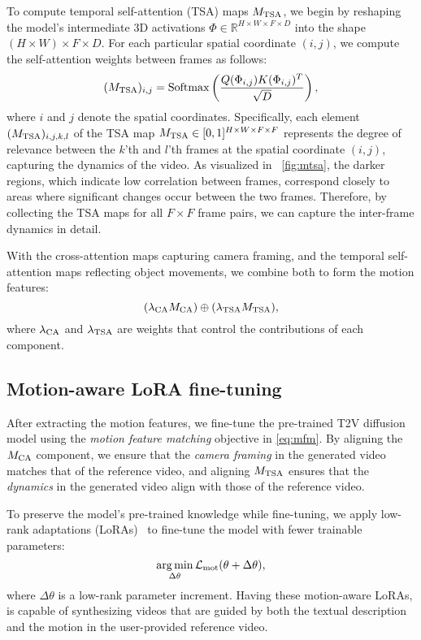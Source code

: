 To compute temporal self-attention (TSA) maps $M_{{\rm TSA}}$, we begin by reshaping the model's intermediate 3D activations $\Phi\in\mathbb{R}^{H\times W\times F\times D}$ into the shape $(H\times W)\times F\times D$. For each particular spatial coordinate $(i,j)$, we compute the self-attention weights between frames as follows:
\begin{equation}
(M_{{\rm TSA}})_{i,j}=\mathrm{Softmax}\left(\frac{Q(\Phi_{i,j})K(\Phi_{i,j})^T}{\sqrt{D}}\right)
\label{eq:features},
\end{equation}
where $i$ and $j$ denote the spatial coordinates. Specifically, each element $(M_{{\rm TSA}})_{i,j,k,l}$ of the TSA map $M_{{\rm TSA}}\in [0,1]^{H\times W\times F\times F}$ represents the degree of relevance between the $k$'th and $l$'th frames at the spatial coordinate $(i,j)$, capturing the dynamics of the video. As visualized in ~\cref{fig:mtsa}, the darker regions, which indicate low correlation between frames, correspond closely to areas where significant changes occur between the two frames. Therefore, by collecting the TSA maps for all $F\times F$ frame pairs, we can capture the inter-frame dynamics in detail.

With the cross-attention maps capturing camera framing, and the temporal self-attention maps reflecting object movements, we combine both to form the motion features:
\begin{equation}(\lambda_{{\rm CA}}M_{{\rm CA}})\oplus (\lambda_{{\rm TSA}}M_{{\rm TSA}})
\label{eq:features},
\end{equation}
where $\lambda_{{\rm CA}}$ and $\lambda_{{\rm TSA}}$ are weights that control the contributions of each component.





\subsection{Motion-aware LoRA fine-tuning}

After extracting the motion features, we fine-tune the pre-trained T2V diffusion model using the \emph{motion feature matching} objective in \cref{eq:mfm}. By aligning the $M_{{\rm CA}}$ component, we ensure that the \emph{camera framing} in the generated video matches that of the reference video, and aligning $M_{{\rm TSA}}$ ensures that the \emph{dynamics} in the generated video align with those of the reference video.

To preserve the model's pre-trained knowledge while fine-tuning, we apply low-rank adaptations (LoRAs)~\cite{lora} to fine-tune the model with fewer trainable parameters: 
\begin{equation}
    \operatorname*{arg\,min}_{\Delta\theta} \mathcal{L}_{\rm mot}(\theta+\Delta\theta),
\end{equation}
where $\Delta\theta$ is a low-rank parameter increment.
Having these motion-aware LoRAs, {\ours} is capable of synthesizing videos that are guided by both the textual description and the motion in the user-provided reference video.